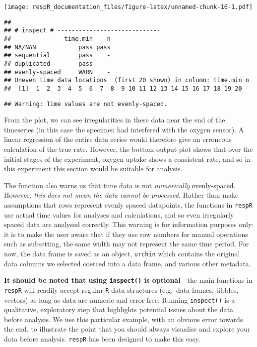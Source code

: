 \documentclass[]{book}
\begin{document}
\texttt{[image: respR\_documentation\_files/figure-latex/unnamed-chunk-16-1.pdf]}

\begin{verbatim}
## 
## # inspect # -----------------------------
##               time.min    n
## NA/NAN            pass pass
## sequential        pass    -
## duplicated        pass    -
## evenly-spaced     WARN    -
## Uneven time data locations  (first 20 shown) in column: time.min n 
##  [1]  1  2  3  4  5  6  7  8  9 10 11 12 13 14 15 16 17 18 19 20
\end{verbatim}

\begin{verbatim}
## Warning: Time values are not evenly-spaced.
\end{verbatim}

From the plot, we can see irregularities in these data near the end of
the timeseries (in this case the specimen had interfered with the oxygen
sensor). A linear regression of the entire data series would therefore
give an erroneous calculation of the true rate. However, the bottom
output plot shows that over the initial stages of the experiment, oxygen
uptake shows a consistent rate, and so in this experiment this section
would be suitable for analysis.

The function also warns us that time data is not \emph{numerically}
evenly-spaced. However, \emph{this does not mean the data cannot be
processed}. Rather than make assumptions that rows represent evenly
spaced datapoints, the functions in \texttt{respR} use actual time
values for analyses and calculations, and so even irregularly spaced
data are analysed correctly. This warning is for information purposes
only: it is to make the user aware that if they use row numbers for
manual operations such as subsetting, the same width may not represent
the same time period. For now, the data frame is saved as an object,
\texttt{urchin} which contains the original data columns we selected
coerced into a data frame, and various other metadata.

\textbf{It should be noted that using \texttt{inspect()} is optional} -
the main functions in \texttt{respR} will readily accept regular
\texttt{R} data structures (e.g.~data frames, tibbles, vectors) as long
as data are numeric and error-free. Running \texttt{inspect()} is a
qualitative, exploratory step that highlights potential issues about the
data before analysis. We use this particular example, with an obvious
error towards the end, to illustrate the point that you should always
visualise and explore your data before analysis. \texttt{respR} has been
designed to make this easy.
\end{document}
